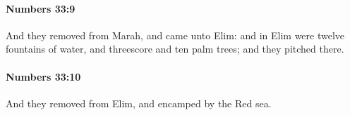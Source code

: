 		\paragraph{Numbers 33:9} %
			\label{NUMBERS-33-9}

			And they removed from Marah, and came unto Elim: and in Elim were twelve fountains of water, and threescore and ten palm trees; and they pitched there.


		\paragraph{Numbers 33:10} %
			\label{NUMBERS-33-10}

			And they removed from Elim, and encamped by the Red sea.


